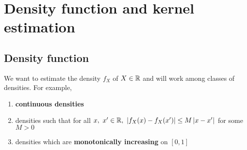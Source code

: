 \section{Density function and kernel estimation}
\subsection{Density function}
We want to estimate the density $f_X$ of $X\in \mathbb{R}$ and will work among classes
of densities. For example,
\begin{enumerate}
    \item \textbf{continuous densities}
    \item densities such that for all $x,\ x'\in \mathbb{R},\ \left| f_X(x)-f_X(x')\right|\le
              M\left| x-x'\right|$ for some $M>0$
    \item densities which are \textbf{monotonically increasing} on $[0,1]$
\end{enumerate}

